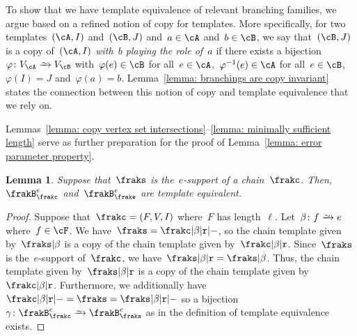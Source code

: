\documentclass[11pt]{amsart}
\def\phi{\varphi}
\newcommand{\bijection}{\mathchoice
	{\xrightarrow{\smash{\raisebox{-3pt}{$\scriptstyle\sim$}}}}%
	{\xrightarrow{\smash{\raisebox{-3pt}{$\scriptstyle\sim$}}}}%
	{\xrightarrow{\smash{\raisebox{-2.5pt}{$\scriptscriptstyle\sim$}}}}%
	{\xrightarrow{\smash{\raisebox{-2.5pt}{$\scriptscriptstyle\sim$}}}}%
}
\newcommand{\R}{\text{\normalfont\ttfamily r}}
\newcommand{\om}{\mathord{-}}
\newtheorem{lemma}[algocf]{Lemma}
\theoremstyle{definition}
\numberwithin{equation}{section}
\begin{document}
	To show that we have template equivalence of relevant branching families, we argue based on a refined notion of copy for templates.
	More specifically, for two templates~$(\cA,I)$ and~$(\cB,J)$ and~$a\in\cA$ and~$b\in\cB$, we say that~$(\cB,J)$ is a copy of~$(\cA,I)$ \emph{with~$b$ playing the role of~$a$} if there exists a bijection~$\phi\colon V_\cA\bijection V_\cB$ with~$\phi(e)\in\cB$ for all~$e\in\cA$,~$\phi^{-1}(e)\in\cA$ for all~$e\in\cB$,~$\phi(I)=J$ and~$\phi(a)=b$.
	Lemma~\ref{lemma: branchings are copy invariant} states the connection between this notion of copy and template equivalence that we rely on.
	
	Lemmas~\ref{lemma: copy vertex set intersections}--\ref{lemma: minimally sufficient length} serve as further preparation for the proof of Lemma~\ref{lemma: error parameter property}.
	
	
	\begin{lemma}\label{lemma: branchings are branchings of support}
		Suppose that~$\fraks$ is the~$e$-support of a chain~$\frakc$.
		Then,~$\frakB_{\frakc}^e$ and~$\frakB_{\fraks}^{e}$ are template equivalent.
	\end{lemma}
	\begin{proof}
		Suppose that~$\frakc=(F,V,I)$ where~$F$ has length~$\ell$.
		Let~$\beta\colon f\bijection e$ where~$f\in\cF$.
		We have~$\fraks=\frakc|\beta|\R|\om$, so the chain template given by~$\fraks|\beta$ is a copy of the chain template given by~$\frakc|\beta|\R$.
		Since~$\fraks$ is the~$e$-support of~$\frakc$, we have~$\fraks|\beta|\R=\fraks|\beta$.
		Thus, the chain template given by~$\fraks|\beta|\R$ is a copy of the chain template given by~$\frakc|\beta|\R$.
		Furthermore, we additionally have~$\frakc|\beta|\R|\om=\fraks=\fraks|\beta|\R|\om$ so a bijection~$\gamma\colon \frakB_{\frakc}^e\bijection \frakB_{\fraks}^{e}$ as in the definition of template equivalence exists.
	\end{proof}
	
\end{document}
